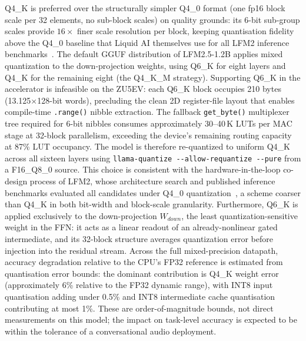 \documentclass[manuscript,]{acmart} %
\begin{document}
Q4\_K is preferred over the structurally simpler Q4\_0 format (one fp16 block scale
per 32 elements, no sub-block scales) on quality grounds: its 6-bit sub-group scales
provide $16{\times}$ finer scale resolution per block, keeping quantisation fidelity
above the Q4\_0 baseline that Liquid AI themselves use for all LFM2 inference
benchmarks~\cite{amini2025lfm2technicalreport}.
The default GGUF distribution of LFM2.5-1.2B applies mixed quantization to the
down-projection weights, using Q6\_K for eight layers and Q4\_K for the remaining
eight (the Q4\_K\_M strategy).
Supporting Q6\_K in the accelerator is infeasible on the ZU5EV: each Q6\_K block
occupies 210 bytes (13.125$\times$128-bit words), precluding the clean 2D
register-file layout that enables compile-time \texttt{.range()} nibble extraction.
The fallback \texttt{get\_byte()} multiplexer tree required for 6-bit nibbles
consumes approximately 30--40\,K LUTs per MAC stage at 32-block
parallelism, exceeding the device's remaining routing capacity at 87\% LUT
occupancy.
The model is therefore re-quantized to uniform Q4\_K across all sixteen layers
using \texttt{llama-quantize -{-}allow-requantize -{-}pure} from a F16\_Q8\_0 source.
This choice is consistent with the hardware-in-the-loop co-design process of LFM2,
whose architecture search and published inference benchmarks evaluated all candidates
under Q4\_0 quantization~\cite{amini2025lfm2technicalreport}, a scheme coarser than
Q4\_K in both bit-width and block-scale granularity.
Furthermore, Q6\_K is applied exclusively to the down-projection $W_{down}$, the
least quantization-sensitive weight in the FFN: it acts as a linear readout of an
already-nonlinear gated intermediate, and its 32-block structure averages
quantization error before injection into the residual stream.
Across the full mixed-precision datapath, accuracy degradation relative to the CPU's FP32 reference is estimated from quantisation error bounds: the dominant contribution is Q4\_K weight error (approximately 6\% relative to the FP32 dynamic range), with INT8 input quantisation adding under 0.5\% and INT8 intermediate cache quantisation contributing at most 1\%. These are order-of-magnitude bounds, not direct measurements on this model; the impact on task-level accuracy is expected to be within the tolerance of a conversational audio deployment.
\end{document}
